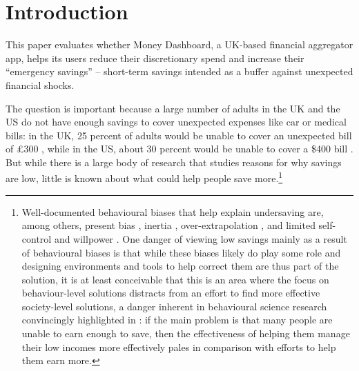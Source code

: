 
\section{Introduction}%
\label{sec:introduction}

This paper evaluates whether Money Dashboard, a UK-based financial aggregator
app, helps its users reduce their discretionary spend and increase their
``emergency savings'' -- short-term savings intended as a buffer against
unexpected financial shocks.

The question is important because a large number of adults in the UK and the US
do not have enough savings to cover unexpected expenses like car or medical
bills: in the UK, 25 percent of adults would be unable to cover an unexpected
bill of \pounds300 \citep{philipps2021supporting}, while in the US, about 30
percent would be unable to cover a \$400 bill \citep{fed2022economic}. But
while there is a large body of research that studies reasons for why savings
are low, little is known about what could help people save
more.\footnote{Well-documented behavioural biases that help explain undersaving
    are, among others, present bias \citep{laibson1997golden,
    ericson2019intertemporal}, inertia \citep{madrian2001power},
    over-extrapolation \citep{choi2009reinforcement}, and limited self-control
    and willpower \citep{thaler1981economic, benhabib2005modeling,
    fudenberg2006dual, loewenstein2004animal, gul2001temptation}. One danger of
    viewing low savings mainly as a result of behavioural biases is that while
    these biases likely do play some role and designing environments and tools
    to help correct them are thus part of the solution, it is at least
    conceivable that this is an area where the focus on behaviour-level
    solutions distracts from an effort to find more effective society-level
    solutions, a danger inherent in behavioural science research convincingly
    highlighted in \citet{chater2022frame}: if the main problem is that many
people are unable to earn enough to save, then the effectiveness of helping
them manage their low incomes more effectively pales in comparison with efforts
to help them earn more.}

